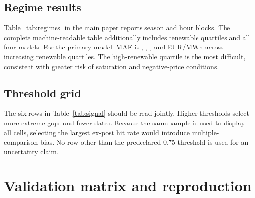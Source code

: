 \documentclass[11pt]{article}
\begin{document}
\subsection{Regime results}

Table~\ref{tab:regimes} in the main paper reports season and hour blocks.
The complete machine-readable table additionally includes renewable
quartiles and all four models. For the primary model, MAE is
\RenewableQOneMAE{}, \RenewableQTwoMAE{}, \RenewableQThreeMAE{}, and
\RenewableQFourMAE{} EUR/MWh across increasing renewable quartiles. The
high-renewable quartile is the most difficult, consistent with greater risk
of saturation and negative-price conditions.

\subsection{Threshold grid}

The six rows in Table~\ref{tab:signal} should be read jointly.  Higher
thresholds select more extreme gaps and fewer dates.  Because the same sample
is used to display all cells, selecting the largest ex-post hit rate would
introduce multiple-comparison bias.  No row other than the predeclared 0.75
threshold is used for an uncertainty claim.

\section{Validation matrix and reproduction}
\end{document}
